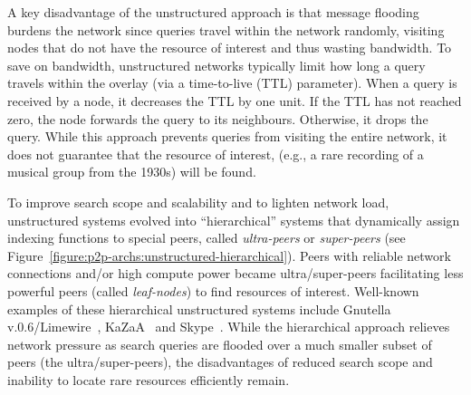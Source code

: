 A key disadvantage of the unstructured approach is that message flooding burdens
the network since queries travel within the network randomly, visiting nodes
that do not have the resource of interest and thus wasting bandwidth.  To save
on bandwidth, unstructured networks typically limit how long a query travels
within the overlay (via a time-to-live (TTL) parameter). When a query is
received by a node, it decreases the TTL by one unit. If the TTL has not reached
zero, the node forwards the query to its neighbours.  Otherwise, it drops the
query. While this approach prevents queries from visiting the entire network, it
does not guarantee that the resource of interest, (e.g., a rare recording 
of a musical group from the 1930s) will be found.

To improve search scope and scalability and to lighten network load, 
unstructured systems evolved into ``hierarchical'' systems that dynamically
assign indexing functions to special peers, called \emph{ultra-peers}  or
\emph{super-peers} (see
Figure~\ref{figure:p2p-archs:unstructured-hierarchical}). Peers with reliable
network connections and/or high compute power became ultra/super-peers
facilitating less powerful peers (called \emph{leaf-nodes}) to find resources of
interest. Well-known examples of these hierarchical unstructured systems include
Gnutella v.0.6/Limewire~\cite{gnutella}, KaZaA~\cite{kazaa} and
Skype~\cite{skype}. While the hierarchical approach relieves network pressure as
search queries are flooded over a much smaller subset of peers (the
ultra/super-peers), the disadvantages of reduced search scope and inability to
locate rare resources efficiently remain.

